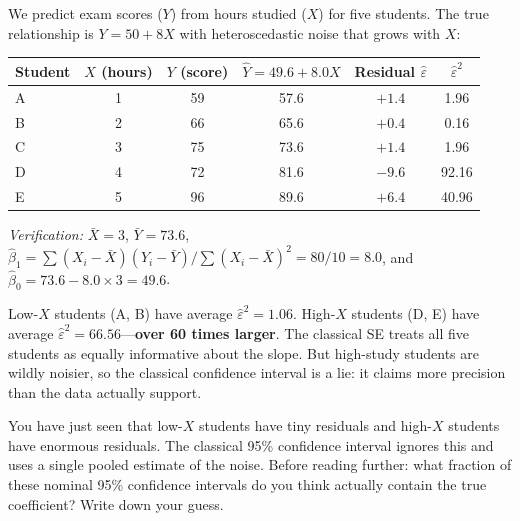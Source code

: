 \documentclass[11pt,a4paper]{article}
\theoremstyle{definition}
\theoremstyle{plain}
\theoremstyle{remark}
\begin{document}
\begin{numermark}[title={Five Students, One Exam}]
We predict exam scores ($Y$) from hours studied ($X$) for five students. The true relationship is $Y = 50 + 8X$ with heteroscedastic noise that grows with $X$:

\begin{center}
\begin{tabular}{@{}lccccc@{}}
\toprule
Student & $X$ (hours) & $Y$ (score) & $\hat{Y} = 49.6 + 8.0X$ & Residual $\hat\varepsilon$ & $\hat\varepsilon^2$ \\
\midrule
A & 1 & 59 & 57.6 & $+1.4$ & 1.96 \\
B & 2 & 66 & 65.6 & $+0.4$ & 0.16 \\
C & 3 & 75 & 73.6 & $+1.4$ & 1.96 \\
D & 4 & 72 & 81.6 & $-9.6$ & 92.16 \\
E & 5 & 96 & 89.6 & $+6.4$ & 40.96 \\
\bottomrule
\end{tabular}
\end{center}

\emph{Verification:} $\bar{X} = 3$, $\bar{Y} = 73.6$, $\hat{\beta}_1 = \sum(X_i - \bar{X})(Y_i - \bar{Y})\big/\sum(X_i - \bar{X})^2 = 80/10 = 8.0$, and $\hat{\beta}_0 = 73.6 - 8.0 \times 3 = 49.6$.

Low-$X$ students (A, B) have average $\hat\varepsilon^2 = 1.06$. High-$X$ students (D, E) have average $\hat\varepsilon^2 = 66.56$---\textbf{over 60 times larger}. The classical SE treats all five students as equally informative about the slope. But high-study students are wildly noisier, so the classical confidence interval is a lie: it claims more precision than the data actually support.
\end{numermark}

\begin{tcolorbox}[colback=truthgold!5, colframe=truthgold!80!black, fonttitle=\bfseries, title={Predict Before You Peek}]
You have just seen that low-$X$ students have tiny residuals and high-$X$ students have enormous residuals. The classical 95\% confidence interval ignores this and uses a single pooled estimate of the noise. Before reading further: what fraction of these nominal 95\% confidence intervals do you think actually contain the true coefficient? Write down your guess.
\end{tcolorbox}
\end{document}

